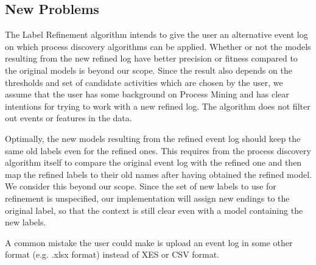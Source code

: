 \documentclass[notitlepage]{article}
\begin{document}
\begin{flushleft}

\subsection{New Problems}
The Label Refinement algorithm intends to give the user an alternative event log on which process discovery algorithms can be applied.
Whether or not the models resulting from the new refined log have better precision or fitness compared to the original models is beyond our scope.
Since the result also depends on the thresholds and set of candidate activities which are chosen by the user, we assume that the user has some background on Process Mining and has clear intentions for trying to work with a new refined log.
The algorithm does not filter out events or features in the data.

Optimally, the new models resulting from the refined event log should keep the same old labels even for the refined ones.
This requires from the process discovery algorithm itself to compare the original event log with the refined one and then map the refined labels to their old names after having obtained the refined model.
We consider this beyond our scope.
Since the set of new labels to use for refinement is unspecified, our implementation will assign new endings to the original label, so that the context is still clear even with a model containing the new labels.

A common mistake the user could make is upload an event log in some other format (e.g. .xlsx format) instead of XES or CSV format.





\end{flushleft}
\end{document}
